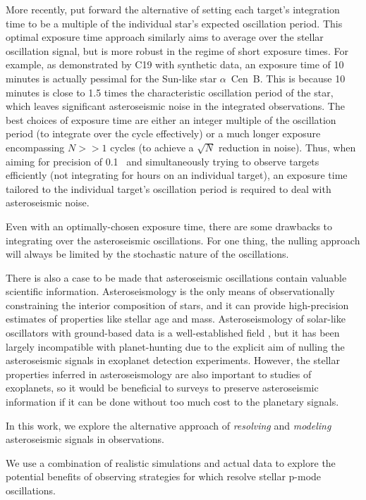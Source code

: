 \documentclass[modern]{aastex62}
\begin{document}
More recently, \citet[][hereafter C19]{Chaplin2019} put forward the alternative of setting each target's integration time to be a multiple of the individual star's expected oscillation period. 
This optimal exposure time approach similarly aims to average over the stellar oscillation signal, but is more robust in the regime of short exposure times. 
For example, as demonstrated by C19 with synthetic data, an exposure time of 10 minutes is actually pessimal for the Sun-like star $\alpha$~Cen~B. 
This is because 10 minutes is close to 1.5 times the characteristic oscillation period of the star, which leaves significant asteroseismic noise in the integrated \RV observations. 
The best choices of exposure time are either an integer multiple of the oscillation period (to integrate over the cycle effectively) or a much longer exposure encompassing $N>>1$ cycles (to achieve a $\sqrt{N}$ reduction in noise). 
Thus, when aiming for \RV precision of 0.1 \ms\ and simultaneously trying to observe targets efficiently (\ie not integrating for hours on an individual target), an exposure time tailored to the individual target's oscillation period is required to deal with asteroseismic noise.

Even with an optimally-chosen exposure time, there are some drawbacks to integrating over the asteroseismic oscillations. 
For one thing, the nulling approach will always be limited by the stochastic nature of the oscillations. 

There is also a case to be made that asteroseismic oscillations contain valuable scientific information. 
Asteroseismology is the only means of observationally constraining the interior composition of stars, and it can provide high-precision estimates of properties like stellar age and mass. 
Asteroseismology of solar-like oscillators with ground-based \RV data is a well-established field \citep[see e.g.][for a review]{Bedding2003}, but it has been largely incompatible with \RV planet-hunting due to the explicit aim of nulling the asteroseismic signals in exoplanet detection experiments. 
However, the stellar properties inferred in asteroseismology are also important to studies of exoplanets, so it would be beneficial to \EPRV surveys to preserve asteroseismic information if it can be done without too much cost to the planetary signals.

In this work, we explore the alternative approach of \textit{resolving} and \textit{modeling} asteroseismic signals in \EPRV observations. 


We use a combination of realistic simulations and actual \EXPRES data to explore the potential benefits of observing strategies for \EPRV which resolve stellar p-mode oscillations. 
\end{document}
